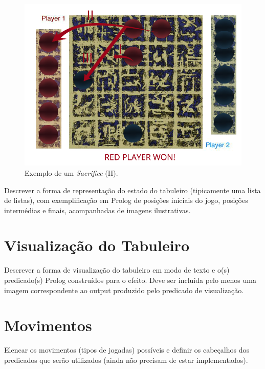 \documentclass[a4paper]{article}
\begin{document}
\begin{figure}[!htb]
	\centering
	\includegraphics[scale=0.3]{images/sacrifice.png}
	\caption{Exemplo de um \textit{Sacrifice} (II).}
\end{figure}

Descrever a forma de representação do estado do tabuleiro (tipicamente uma lista de listas), com exemplificação em Prolog de posições iniciais do jogo, posições intermédias e finais, acompanhadas de imagens ilustrativas.


\section{Visualização do Tabuleiro}

Descrever a forma de visualização do tabuleiro em modo de texto e o(s) predicado(s) Prolog construídos para o efeito.
Deve ser incluída pelo menos uma imagem correspondente ao output produzido pelo predicado de visualização.


\section{Movimentos}

Elencar os movimentos (tipos de jogadas) possíveis e definir os cabeçalhos dos predicados que serão utilizados (ainda não precisam de estar implementados).
\end{document}

